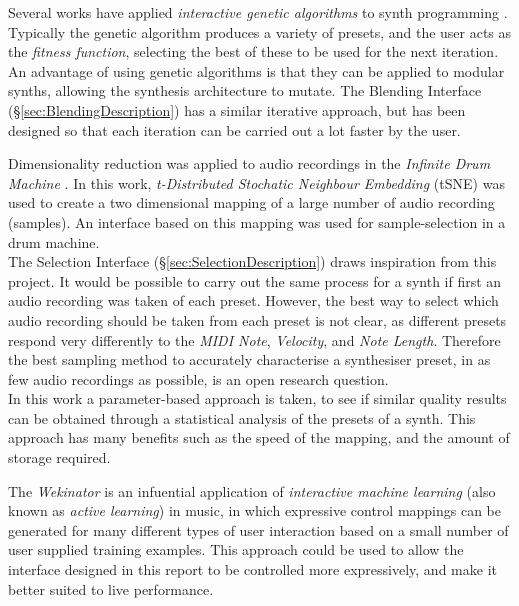 \documentclass[11pt, oneside]{report}   	%
\begin{document}
Several works have applied \emph{interactive genetic algorithms} to synth programming \cite{EvolutionaryInteractive, GenSynth, GenComparison}. Typically the genetic algorithm produces a variety of presets, and the user acts as the \emph{fitness function}, selecting the best of these to be used for the next iteration. An advantage of using genetic algorithms is that they can be applied to modular synths, allowing the synthesis architecture to mutate. The Blending Interface (\S \ref{sec:BlendingDescription}) has a similar iterative approach, but has been designed so that each iteration can be carried out a lot faster by the user. 

Dimensionality reduction was applied to audio recordings in the \emph{Infinite Drum Machine} \cite{InfiniteDrum}. In this work, \emph{t-Distributed Stochatic Neighbour Embedding} (tSNE) was used to create a two dimensional mapping of a large number of audio recording (samples). An interface based on this mapping was used for sample-selection in a drum machine. \\
The Selection Interface (\S \ref{sec:SelectionDescription}) draws inspiration from this project. It would be possible to carry out the same process for a synth if first an audio recording was taken of each preset. However, the best way to select which audio recording should be taken from each preset is not clear, as different presets respond very differently to the \emph{MIDI Note}, \emph{Velocity}, and \emph{Note Length}. Therefore the best sampling method to accurately characterise a synthesiser preset, in as few audio recordings as possible, is an open research question.\\
In this work a parameter-based approach is taken, to see if similar quality results can be obtained through a statistical analysis of the presets of a synth. This approach has many benefits such as the speed of the mapping, and the amount of storage required.

The \emph{Wekinator} \cite{Wekinator} is an infuential application of \emph{interactive machine learning} (also known as \emph{active learning}) in music, in which expressive control mappings can be generated for many different types of user interaction based on a small number of user supplied training examples. This approach could be used to allow the interface designed in this report to be controlled more expressively, and make it better suited to live performance. \vspace{-10pt}
\end{document}
